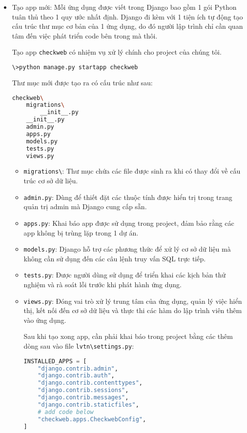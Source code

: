 \begin{itemize}
	\item Tạo app mới: Mỗi ứng dụng được viết trong Django bao gồm 1 gói Python tuân thủ theo 1 quy ước nhất định. Django đi kèm với 1 tiện ích tự động tạo cấu trúc thư mục cơ bản của 1 ứng dụng, do đó người lập trình chỉ cần quan tâm đến việc phát triển code bên trong mà thôi.
	\par
	Tạo app \texttt{checkweb}	có nhiệm vụ xử lý chính cho project của chúng tôi.
	\begin{lstlisting}[language=bash]
\>python manage.py startapp checkweb
	\end{lstlisting}
	Thư mục mới được tạo ra có cấu trúc như sau:
	\begin{lstlisting}[language=bash]
checkweb\
	migrations\
		__init__.py
	__init__.py
	admin.py
	apps.py
	models.py
	tests.py
	views.py
	\end{lstlisting}
	\begin{itemize}
		\item \texttt{migrations\textbackslash}: Thư mục chứa các file được sinh ra khi có thay đổi về cấu trúc cơ sở dữ liệu.
		\item \texttt{admin.py}: Dùng để thiết đặt các thuộc tính được hiển trị trong trang quản trị admin mà Django cung cấp sẵn.
		\item \texttt{apps.py}: Khai báo app được sử dụng trong project, đảm bảo rằng các app không bị trùng lặp trong 1 dự án.
		\item \texttt{models.py}: Django hỗ trợ các phương thức để xử lý cơ sở dữ liệu mà không cần sử dụng đến các câu lệnh truy vấn SQL trực tiếp.
		\item \texttt{tests.py}: Được người dùng sử dụng để triển khai các kịch bản thử nghiệm và rà soát lỗi trước khi phát hành ứng dụng.
		\item \texttt{views.py}: Đóng vai trò xử lý trung tâm của ứng dụng, quản lý việc hiển thị, kết nối đến cơ sở dữ liệu và thực thi các hàm do lập trình viên thêm vào ứng dụng.
		\par
		Sau khi tạo xong app, cần phải khai báo trong project bằng các thêm dòng sau vào file \texttt{lvtn\textbackslash settings.py}:
		\begin{lstlisting}[language=Python]
INSTALLED_APPS = [
    "django.contrib.admin",
    "django.contrib.auth",
    "django.contrib.contenttypes",
    "django.contrib.sessions",
    "django.contrib.messages",
    "django.contrib.staticfiles",
    # add code below
    "checkweb.apps.CheckwebConfig",
]
	\end{lstlisting}
	\end{itemize}

\end{itemize}
